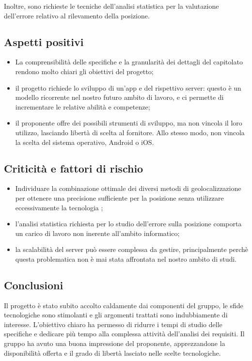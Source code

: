 \documentclass[../studio-di-fattibilita.tex]{subfiles}
\begin{document}
  Inoltre, sono richieste le tecniche dell'analisi statistica per la valutazione dell'errore relativo al rilevamento della posizione.


  \subsection{Aspetti positivi}%
  \label{subsec:aspetti_positivi}
  \begin{itemize}
    \item La comprensibilità delle specifiche e la granularità dei dettagli del capitolato rendono molto chiari gli obiettivi del progetto;
    \item il progetto richiede lo sviluppo di un'app e del rispettivo server: questo è un modello ricorrente nel nostro futuro ambito di lavoro, e ci permette di incrementare le relative abilità e competenze;
    \item il proponente offre dei possibili strumenti di sviluppo, ma non vincola il loro utilizzo, lasciando libertà di scelta al fornitore. Allo stesso modo, non vincola la scelta del sistema operativo, Android o iOS\@.
  \end{itemize}


  \subsection{Criticità e fattori di rischio}%
  \label{subsec:criticita_e_fattori_di_rischio}
  \begin{itemize}
    \item Individuare la combinazione ottimale dei diversi metodi di geolocalizzazione per ottenere una precisione sufficiente per la posizione senza utilizzare eccessivamente la tecnologia ;
    \item l'analisi statistica richiesta per lo studio dell'errore sulla posizione comporta un carico di lavoro non inerente all'ambito informatico;
    \item la scalabilità del server può essere complessa da gestire, principalmente perchè questa problematica non è mai stata affrontata nel nostro ambito di studi.
  \end{itemize}


  \subsection{Conclusioni}%
  \label{subsec:conclusioni}
  Il progetto è stato subito accolto caldamente dai componenti del gruppo, le sfide tecnologiche sono stimolanti e gli argomenti trattati sono indubbiamente di interesse. L'obiettivo chiaro ha permesso di ridurre i tempi di studio delle specifiche e dedicare più tempo alla complessa attività dell'analisi dei requisiti. Il gruppo ha avuto una buona impressione del proponente, apprezzandone la disponibilità offerta e il grado di libertà lasciato nelle scelte tecnologiche.
\end{document}
